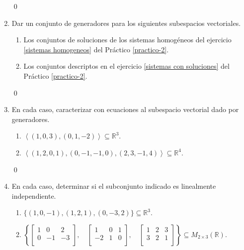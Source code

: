 \begin{enumerate}[resume, topsep=6pt, itemsep=.4cm]
    \qed     
    
    \item\label{practicos anteriores} Dar un conjunto de generadores para los siguientes subespacios vectoriales.
    \begin{enumerate}
    \item Los conjuntos de soluciones de los sistemas homogéneos del ejercicio \ref{sistemas homogeneos} del Práctico \ref{practico-2}.
    \item Los conjuntos descriptos en el ejercicio \ref{sistemas con soluciones} del Práctico  \ref{practico-2}.
    \end{enumerate}
    
    \rta 

    \qed     
    
    \item\label{caracterizar}  En cada caso, caracterizar con ecuaciones al subespacio vectorial dado por generadores.
    \begin{enumerate}
    \item ${\left\langle(1,0,3),(0,1,-2)\right\rangle}\subseteq \mathbb{R}^3$.
    \item ${\left\langle(1,2,0,1),(0,-1,-1,0),(2,3,-1,4)\right\rangle}\subseteq \mathbb{R}^4$.
    \end{enumerate}
    
    
    \rta 

    \qed     
    
    \item\label{son LI} En cada caso, determinar si el subconjunto indicado es linealmente independiente.
    \begin{enumerate}
        \item $\{ (1,0,-1), (1,2,1), (0,-3,2) \}\subseteq \mathbb{R}^3$.
        \item $\left\{  \begin{bmatrix} 1 & 0 & 2 \\ 0 & -1 & -3 \\ \end{bmatrix}, \quad
        \begin{bmatrix} 1 & 0 & 1 \\ -2 & 1 & 0 \\ \end{bmatrix}, \quad
        \begin{bmatrix} 1 & 2 & 3 \\ 3 & 2 & 1 \\ \end{bmatrix} \right\}\subseteq M_{2\times 3}(\mathbb{R})$.
    \end{enumerate}
    

\end{enumerate}
